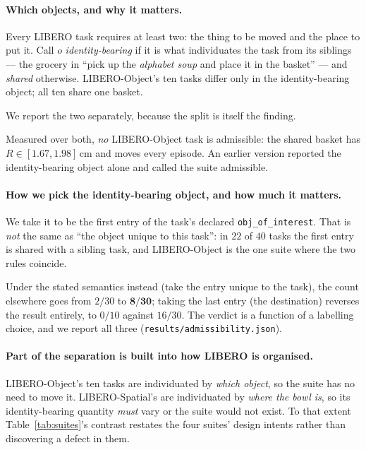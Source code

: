 \documentclass[10pt,twocolumn]{article}
\begin{document}
\paragraph{Which objects, and why it matters.} Every LIBERO task requires at
least two: the thing to be moved and the place to put it. Call $o$
\emph{identity-bearing} if it is what individuates the task from its siblings
--- the grocery in ``pick up the \emph{alphabet soup} and place it in the
basket'' --- and \emph{shared} otherwise. LIBERO-Object's ten tasks differ only
in the identity-bearing object; all ten share one basket.

We report the two separately, because the split is itself the finding.

Measured over both, \emph{no} LIBERO-Object task is admissible: the shared
basket has $R \in [1.67, 1.98]$\,cm and moves every episode. An earlier version
reported the identity-bearing object alone and called the suite admissible.

\paragraph{How we pick the identity-bearing object, and how much it matters.}
We take it to be the first entry of the task's declared
\texttt{obj\_of\_interest}. That is \emph{not} the same as ``the object unique
to this task'': in $22$ of $40$ tasks the first entry is shared with a sibling
task, and LIBERO-Object is the one suite where the two rules coincide.

Under the stated semantics instead (take the entry unique to the task), the
count elsewhere goes from $2/30$ to $\mathbf{8/30}$; taking the last entry (the
destination) reverses the result entirely, to $0/10$ against $16/30$. The
verdict is a function of a labelling choice, and we report all three
(\texttt{results/admissibility.json}).

\paragraph{Part of the separation is built into how LIBERO is organised.}
LIBERO-Object's ten tasks are individuated by \emph{which object}, so the suite
has no need to move it. LIBERO-Spatial's are individuated by \emph{where the bowl is}, so its
identity-bearing quantity \emph{must} vary or the suite would not exist. To
that extent Table~\ref{tab:suites}'s contrast restates the four suites' design
intents rather than discovering a defect in them.
\end{document}
